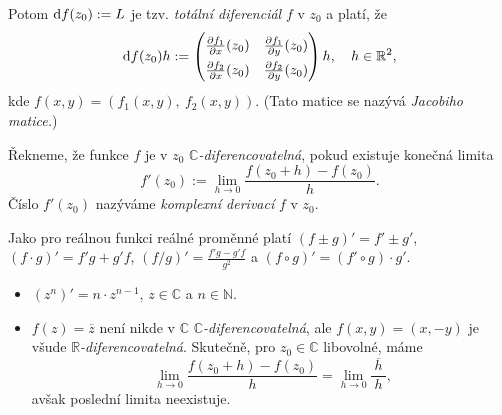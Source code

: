 \begin{note}

Potom $\mathop{}\!\mathrm{d} f(z_0):=L$ je tzv. \emph{totální diferenciál} $f$ v $z_0$ a platí, že 
$$\diff f(z_0)h:=
\renewcommand\arraystretch{1.5}
\begin{pmatrix}
\frac{\partial f_1}{\partial x}(z_0) & \frac{\partial f_1}{\partial y}(z_0)\\
\frac{\partial f_2}{\partial x}(z_0) & \frac{\partial f_2}{\partial y}(z_0)
\end{pmatrix}h\text{,\hspace{3mm} }h\in \mathbb{R}^2\text{,}$$
kde $f(x,y) = (f_1(x,y), \ f_2(x,y)).$ (Tato matice se nazývá \emph{Jacobiho matice.})
\end{note} 


\begin{definition}
Řekneme, že funkce $f$ je v $z_0$ $\mathbb{C}$\emph{-diferencovatelná}, pokud existuje konečná limita 
\[f'(z_0):= \lim_{h \to 0}\frac{f(z_0+h)-f(z_0)}{h}.\] 
Číslo $f'(z_0)$ nazýváme \emph{komplexní derivací} $f$ v $z_0$. 
\end{definition}  

\begin{note}
Jako pro reálnou funkci reálné proměnné platí $(f\pm g)'=f'\pm{g'}$, $(f\cdot g)'=f'g+g'f$, $(f/g)'=\frac{f'g-g'f}{g^2}$ a $(f\circ g)'=(f'\circ{g}) \cdot g'$.

\end{note} 

\begin{example}\mbox{}
\begin{itemize}
    \item $(z^n)' = n\cdot z^{n-1}$, $z\in \mathbb{C}$ a $n\in \mathbb{N}\text{.}$
    \item $f(z) = \overline{z}$ není nikde v $\mathbb{C}$ $\mathbb{C}$\emph{-diferencovatelná}, ale $f(x,y) = (x,-y)$ je všude $\mathbb{R}$\emph{-diferencovatelná}. Skutečně, pro $z_0\in\mathbb{C}$ libovolné, máme $$\lim_{h\to 0}\frac{f(z_0+h)-f(z_0)}{h} = \lim_{h\to 0}\frac{\ \overline{h}\ }{h}\text{,}$$ avšak poslední limita neexistuje. 
    \end{itemize}
\end{example}


